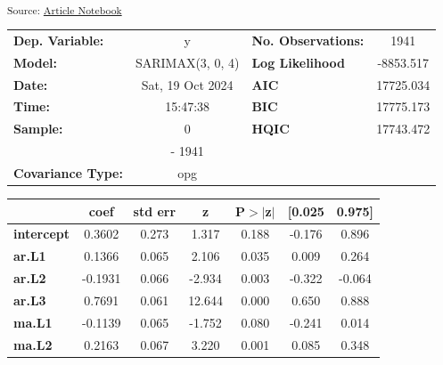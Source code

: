 \documentclass[
  number,
  preprint,
  3p,
  onecolumn]{elsarticle}
\begin{document}
\textsubscript{Source:
\href{https://iancont.github.io/fixed_income_garch/index-preview.html}{Article
Notebook}}

\begin{center}
\begin{tabular}{lclc}
\toprule
\textbf{Dep. Variable:}          &        y         & \textbf{  No. Observations:  } &    1941     \\
\textbf{Model:}                  & SARIMAX(3, 0, 4) & \textbf{  Log Likelihood     } & -8853.517   \\
\textbf{Date:}                   & Sat, 19 Oct 2024 & \textbf{  AIC                } & 17725.034   \\
\textbf{Time:}                   &     15:47:38     & \textbf{  BIC                } & 17775.173   \\
\textbf{Sample:}                 &        0         & \textbf{  HQIC               } & 17743.472   \\
\textbf{}                        &      - 1941      & \textbf{                     } &             \\
\textbf{Covariance Type:}        &       opg        & \textbf{                     } &             \\
\bottomrule
\end{tabular}
\begin{tabular}{lcccccc}
                   & \textbf{coef} & \textbf{std err} & \textbf{z} & \textbf{P$> |$z$|$} & \textbf{[0.025} & \textbf{0.975]}  \\
\midrule
\textbf{intercept} &       0.3602  &        0.273     &     1.317  &         0.188        &       -0.176    &        0.896     \\
\textbf{ar.L1}     &       0.1366  &        0.065     &     2.106  &         0.035        &        0.009    &        0.264     \\
\textbf{ar.L2}     &      -0.1931  &        0.066     &    -2.934  &         0.003        &       -0.322    &       -0.064     \\
\textbf{ar.L3}     &       0.7691  &        0.061     &    12.644  &         0.000        &        0.650    &        0.888     \\
\textbf{ma.L1}     &      -0.1139  &        0.065     &    -1.752  &         0.080        &       -0.241    &        0.014     \\
\textbf{ma.L2}     &       0.2163  &        0.067     &     3.220  &         0.001        &        0.085    &        0.348     \\

\end{tabular}
\end{center}
\end{document}
